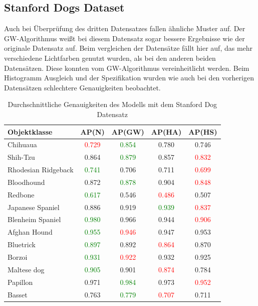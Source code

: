 \documentclass[a4paper,12pt,oneside]{article}
\begin{document}
  \subsection{Stanford Dogs Dataset}
Auch bei Überprüfung des dritten Datensatzes fallen ähnliche Muster auf. Der GW-Algorithmus weißt bei diesem Datensatz sogar bessere Ergebnisse wie der originale Datensatz auf. Beim vergleichen der Datensätze fällt hier auf, das mehr verschiedene Lichtfarben genutzt wurden, als bei den anderen beiden Datensätzen. Diese konnten vom GW-Algorithmus vereinheitlicht werden. Beim Histogramm Ausgleich und der Spezifikation wurden wie auch bei den vorherigen Datensätzen schlechtere Genauigkeiten beobachtet.   
\begin{table}
[h]
\caption{Durchschnittliche Genauigkeiten des Modells mit dem Stanford Dog Datensatz}
\centering
\begin{tabular}{|l|c|c|c|c|}
\hline
Objektklasse & AP(N) & AP(GW) & AP(HA) & AP(HS)\\
\hline
Chihuaua & \textcolor{red}{0.729} & \textcolor{green}{0.854} & 0.780 & 0.746\\ 
Shih-Tzu & 0.864 & \textcolor{green}{0.879} & 0.857 & \textcolor{red}{0.832}\\
Rhodesian Ridgeback & \textcolor{green}{0.741} & 0.706 & 0.711 & \textcolor{red}{0.699}\\
Bloodhound & 0.872 & \textcolor{green}{0.878} & 0.904 & \textcolor{red}{0.848}\\
Redbone & \textcolor{green}{0.617} & 0.546 & \textcolor{red}{0.486} & 0.507\\ 
Japanese Spaniel & 0.886 & 0.919 & \textcolor{green}{0.939} & \textcolor{red}{0.837}\\
Blenheim Spaniel & \textcolor{green}{0.980} & 0.966 & 0.944 & \textcolor{red}{0.906}\\
Afghan Hound & \textcolor{green}{0.955} & \textcolor{red}{0.946} & 0.947 & 0.953\\
Bluetrick & \textcolor{green}{0.897} & 0.892 & \textcolor{red}{0.864} & 0.870\\ 
Borzoi & \textcolor{green}{0.931} & \textcolor{red}{0.922} & 0.932 & 0.925\\
Maltese dog & \textcolor{green}{0.905} & 0.901 & \textcolor{red}{0.874} & 0.784\\
Papillon & 0.971 & \textcolor{green}{0.984} & 0.973 & \textcolor{red}{0.952}\\
Basset & 0.763 & \textcolor{green}{0.779} & \textcolor{red}{0.707} & 0.711\\

\end{tabular}
\end{table}
\end{document}
